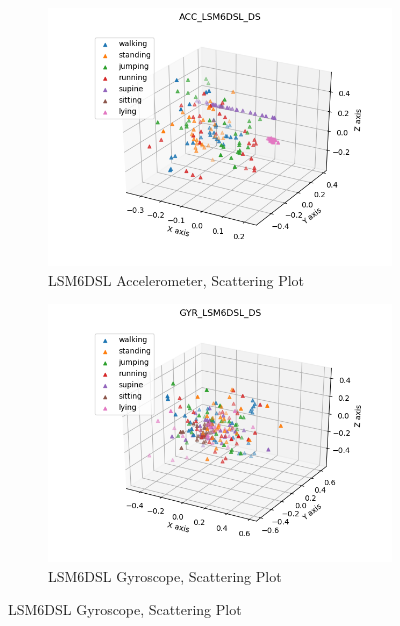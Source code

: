 \begin{center}
	\begin{figure}[H]
		\begin{subfigure}[H]{0.45\textwidth}
			\includegraphics[scale=0.6]{figures/scatter3d_ACC_LSM6DSL_DS.png}
			\caption{LSM6DSL Accelerometer, Scattering Plot}\label{fig:8a}
		\end{subfigure}
		\begin{subfigure}[H]{0.45\textwidth}
			\includegraphics[scale=0.6]{figures/scatter3d_GYR_LSM6DSL_DS.png}
			\caption{LSM6DSL Gyroscope, Scattering Plot}\label{fig:8b}
		\end{subfigure}
	\end{figure} 
\end{center}
